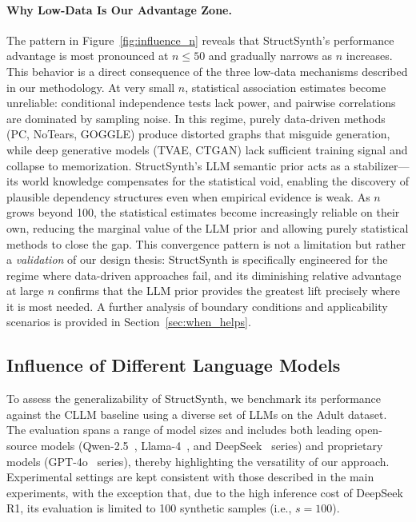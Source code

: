 \paragraph{Why Low-Data Is Our Advantage Zone.}
The pattern in Figure~\ref{fig:influence_n} reveals that \textsf{StructSynth}'s performance advantage is most pronounced at $n \leq 50$ and gradually narrows as $n$ increases. This behavior is a direct consequence of the three low-data mechanisms described in our methodology. At very small $n$, statistical association estimates become unreliable: conditional independence tests lack power, and pairwise correlations are dominated by sampling noise. In this regime, purely data-driven methods (PC, NoTears, GOGGLE) produce distorted graphs that misguide generation, while deep generative models (TVAE, CTGAN) lack sufficient training signal and collapse to memorization. \textsf{StructSynth}'s LLM semantic prior acts as a stabilizer---its world knowledge compensates for the statistical void, enabling the discovery of plausible dependency structures even when empirical evidence is weak. As $n$ grows beyond 100, the statistical estimates become increasingly reliable on their own, reducing the marginal value of the LLM prior and allowing purely statistical methods to close the gap. This convergence pattern is not a limitation but rather a \emph{validation} of our design thesis: \textsf{StructSynth} is specifically engineered for the regime where data-driven approaches fail, and its diminishing relative advantage at large $n$ confirms that the LLM prior provides the greatest lift precisely where it is most needed. A further analysis of boundary conditions and applicability scenarios is provided in Section~\ref{sec:when_helps}.


\subsection{Influence of Different Language Models}

To assess the generalizability of \textsf{StructSynth}, we benchmark its performance against the CLLM baseline using a diverse set of LLMs on the Adult dataset. The evaluation spans a range of model sizes and includes both leading open-source models (Qwen-2.5~\cite{team2024qwen2}, Llama-4~\cite{meta2025llama4}, and DeepSeek~\cite{liu2024deepseek, guo2025deepseek} series) and proprietary models (GPT-4o~\cite{hurst2024gpt} series), thereby highlighting the versatility of our approach. Experimental settings are kept consistent with those described in the main experiments, with the exception that, due to the high inference cost of DeepSeek R1, its evaluation is limited to 100 synthetic samples (i.e., $s=100$).

